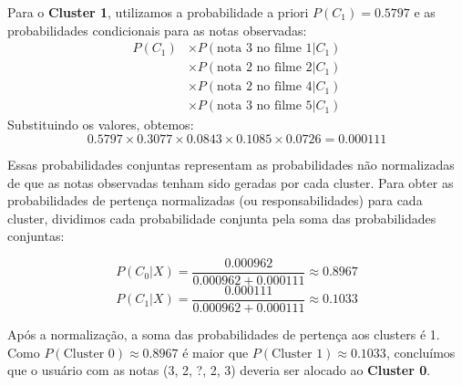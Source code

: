 \begin{enumerate}[label=(\alph*)]
Para o \textbf{Cluster 1}, utilizamos a probabilidade a priori \( P(C_1) = 0.5797 \) e as probabilidades condicionais para as notas observadas:
\begin{align*}
    P(C_1) &\times P(\text{nota 3 no filme 1}|C_1) \\
    &\times P(\text{nota 2 no filme 2}|C_1) \\
    &\times P(\text{nota 2 no filme 4}|C_1) \\
    &\times P(\text{nota 3 no filme 5}|C_1)
\end{align*}
Substituindo os valores, obtemos:
\[
0.5797 \times 0.3077 \times 0.0843 \times 0.1085 \times 0.0726 = 0.000111
\]

Essas probabilidades conjuntas representam as probabilidades não normalizadas de que as notas observadas tenham sido geradas por cada cluster. Para obter as probabilidades de pertença normalizadas (ou responsabilidades) para cada cluster, dividimos cada probabilidade conjunta pela soma das probabilidades conjuntas:

\[
P(C_0 | X) = \frac{0.000962}{0.000962 + 0.000111} \approx 0.8967
\]
\[
P(C_1 | X) = \frac{0.000111}{0.000962 + 0.000111} \approx 0.1033
\]

Após a normalização, a soma das probabilidades de pertença aos clusters é 1. Como \( P(\text{Cluster 0}) \approx 0.8967 \) é maior que \( P(\text{Cluster 1}) \approx 0.1033 \), concluímos que o usuário com as notas (3, 2, ?, 2, 3) deveria ser alocado ao \textbf{Cluster 0}.

\end{enumerate}

